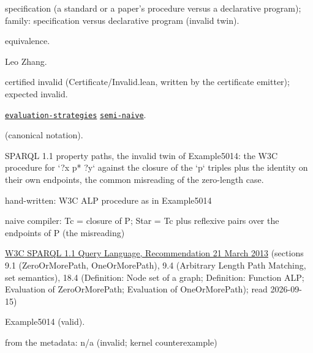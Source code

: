 \documentclass[10pt]{article}
\begin{document}
\begin{description}[leftmargin=2.6cm,style=nextline,itemsep=1pt]

\item[Category] specification (a standard or a paper's procedure versus a declarative program); family: specification versus declarative program (invalid twin).

\item[Kind] equivalence.

\item[Contributors] Leo Zhang.

\item[Status] certified invalid (Certificate/Invalid.lean, written by the certificate emitter); expected invalid.

\item[Tags] \hyperref[tag:evaluation-strategies]{\texttt{evaluation-strategies}} \hyperref[tag:semi-naive]{\texttt{semi-naive}}.

\item[Input]  (canonical notation).

\item[Summary] SPARQL 1.1 property paths, the invalid twin of Example5014: the W3C procedure for `?x p* ?y` against the closure of the `p` triples plus the identity on their own endpoints, the common misreading of the zero-length case.

\item[Sides] hand-written: W3C ALP procedure as in Example5014 \par naive compiler: Tc = closure of P; Star = Tc plus reflexive pairs over the endpoints of P (the misreading)

\item[Sources] {\raggedright \href{https://www.w3.org/TR/sparql11-query/}{W3C SPARQL 1.1 Query Language, Recommendation 21 March 2013} (sections 9.1 (ZeroOrMorePath, OneOrMorePath), 9.4 (Arbitrary Length Path Matching, set semantics), 18.4 (Definition: Node set of a graph; Definition: Function ALP; Evaluation of ZeroOrMorePath; Evaluation of OneOrMorePath); read 2026-09-15)\par}

\item[Twin] Example5014 (valid).

\item[Obstruction note] from the metadata: n/a (invalid; kernel counterexample)

\end{description}
\end{document}

